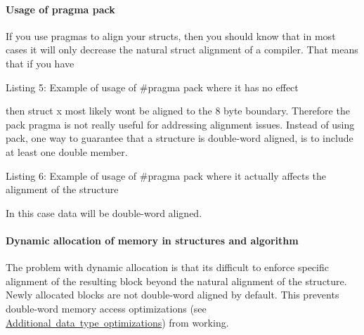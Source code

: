 \hypertarget{a00832_subsubsection__pragma_pack}{}\paragraph{Usage of pragma pack}\label{a00832_subsubsection__pragma_pack}
If you use pragmas to align your structs, then you should know that in most cases it will only decrease the natural struct alignment of a compiler. That means that if you have


\begin{DoxyCode}{0}
\DoxyCodeLine{\textcolor{preprocessor}{\#pragma pack(8)}}
\DoxyCodeLine{\{}
\DoxyCodeLine{\};}
\end{DoxyCode}
  Listing 5\+: Example of usage of {\ttfamily \#pragma pack} where it has no effect

then struct x most likely won\textquotesingle{}t be aligned to the 8 byte boundary. Therefore the pack pragma is not really useful for addressing alignment issues. Instead of using pack, one way to guarantee that a structure is double-\/word aligned, is to include at least one double member.


\begin{DoxyCode}{0}
\DoxyCodeLine{\textcolor{preprocessor}{\#pragma pack(8)}}
\DoxyCodeLine{\{}
\DoxyCodeLine{\};}
\end{DoxyCode}
  Listing 6\+: Example of usage of {\ttfamily \#pragma pack} where it actually affects the alignment of the structure

In this case data will be double-\/word aligned.

\hypertarget{a00832_subsubsection__dynamic_allocation_of_memory}{}\paragraph{Dynamic allocation of memory in structures and algorithm}\label{a00832_subsubsection__dynamic_allocation_of_memory}
The problem with dynamic allocation is that it\textquotesingle{}s difficult to enforce specific alignment of the resulting block beyond the natural alignment of the structure. Newly allocated blocks are not double-\/word aligned by default. This prevents double-\/word memory access optimizations (see \mbox{\hyperlink{a00832_subsubsection__additional_data_type_optimizations_}{Additional data type optimizations}}) from working.


